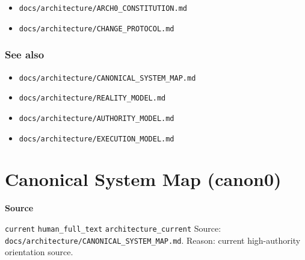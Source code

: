 \documentclass[9pt,a4paper,openany]{book}
\newcommand{\vonecallout}[3]{\par\medskip\noindent\begingroup\setlength{\fboxsep}{7pt}\colorbox{DomCalloutBg}{\parbox{0.94\linewidth}{\textbf{\textcolor{#1}{#2}}\par #3}}\endgroup\par\medskip}
\begin{document}
\begin{itemize}
\item \texttt{docs/\allowbreak{}architecture/\allowbreak{}ARCH0\_\allowbreak{}CONSTITUTION.\allowbreak{}md}
\end{itemize}


\begin{itemize}
\item \texttt{docs/\allowbreak{}architecture/\allowbreak{}CHANGE\_\allowbreak{}PROTOCOL.\allowbreak{}md}
\end{itemize}





\subsubsection{See also}


\begin{itemize}
\item \texttt{docs/\allowbreak{}architecture/\allowbreak{}CANONICAL\_\allowbreak{}SYSTEM\_\allowbreak{}MAP.\allowbreak{}md}
\end{itemize}


\begin{itemize}
\item \texttt{docs/\allowbreak{}architecture/\allowbreak{}REALITY\_\allowbreak{}MODEL.\allowbreak{}md}
\end{itemize}


\begin{itemize}
\item \texttt{docs/\allowbreak{}architecture/\allowbreak{}AUTHORITY\_\allowbreak{}MODEL.\allowbreak{}md}
\end{itemize}


\begin{itemize}
\item \texttt{docs/\allowbreak{}architecture/\allowbreak{}EXECUTION\_\allowbreak{}MODEL.\allowbreak{}md}
\end{itemize}



\section{Canonical System Map (canon0)}

\vonecallout{DomSlate}{Source}{\texttt{current} \texttt{human\_\allowbreak{}full\_\allowbreak{}text} \texttt{architecture\_\allowbreak{}current} Source: \texttt{docs/\allowbreak{}architecture/\allowbreak{}CANONICAL\_\allowbreak{}SYSTEM\_\allowbreak{}MAP.\allowbreak{}md}.\allowbreak{} Reason: current high-\allowbreak{}authority orientation source.\allowbreak{}}
\end{document}
